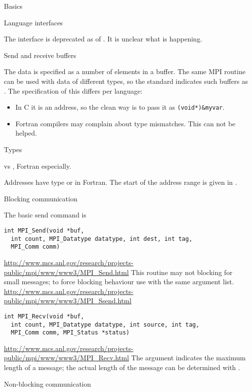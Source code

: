  {Basics}

 {Language interfaces}

The  interface is deprecated as of .
It is unclear what is happening.

 {Send and receive buffers}

The data is specified as a number of elements in a buffer. The same
MPI routine can be used with data of different types, so the standard
indicates such buffers as . The specification of
this differs per language:
\begin{itemize}
\item In C it is an address, so the clean way is to pass it as
  \verb+(void*)&myvar+.
\item Fortran compilers may complain about type mismatches. This can
  not be helped.
\end{itemize}

 {Types}

 vs , Fortran especially.

Addresses have type  or  in Fortran. The start of the address range is
given in .

 {Blocking communication}

The basic send command is
\begin{verbatim}
int MPI_Send(void *buf, 
  int count, MPI_Datatype datatype, int dest, int tag,
  MPI_Comm comm)
\end{verbatim}
\url{http://www.mcs.anl.gov/research/projects-public/mpi/www/www3/MPI_Send.html}
This routine may not blocking for small messages; to force blocking
behaviour use  with the same argument list.
\url{http://www.mcs.anl.gov/research/projects-public/mpi/www/www3/MPI_Ssend.html}

\begin{verbatim}
int MPI_Recv(void *buf, 
  int count, MPI_Datatype datatype, int source, int tag,
  MPI_Comm comm, MPI_Status *status)
\end{verbatim}
\url{http://www.mcs.anl.gov/research/projects-public/mpi/www/www3/MPI_Recv.html}
The  argument indicates the maximum length of a message; the
actual length of the message can be determined with .

 {Non-blocking communication}


